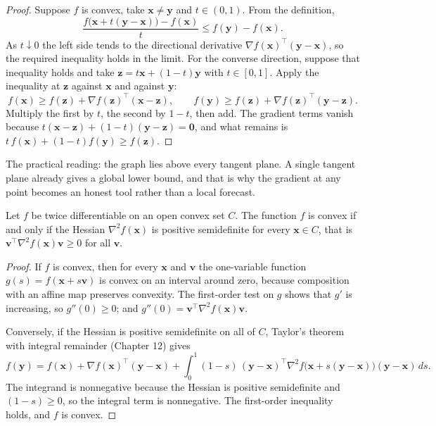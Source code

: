 \begin{proof}
Suppose $f$ is convex, take $\mathbf{x}\ne\mathbf{y}$ and $t\in(0,1)$. From the definition,
\[
  \frac{f\bigl(\mathbf{x}+t(\mathbf{y}-\mathbf{x})\bigr)-f(\mathbf{x})}{t}
  \le f(\mathbf{y})-f(\mathbf{x}).
\]
As $t\downarrow0$ the left side tends to the directional derivative
$\nabla f(\mathbf{x})^{\top}(\mathbf{y}-\mathbf{x})$, so the required inequality holds in the
limit. For the converse direction, suppose that inequality holds and take
$\mathbf{z}=t\mathbf{x}+(1-t)\mathbf{y}$ with $t\in[0,1]$. Apply the inequality at
$\mathbf{z}$ against $\mathbf{x}$ and against $\mathbf{y}$:
\[
  f(\mathbf{x})\ge f(\mathbf{z})+\nabla f(\mathbf{z})^{\top}(\mathbf{x}-\mathbf{z}),
  \qquad
  f(\mathbf{y})\ge f(\mathbf{z})+\nabla f(\mathbf{z})^{\top}(\mathbf{y}-\mathbf{z}).
\]
Multiply the first by $t$, the second by $1-t$, then add. The gradient terms vanish because
$t(\mathbf{x}-\mathbf{z})+(1-t)(\mathbf{y}-\mathbf{z})=\mathbf{0}$, and what remains is
$t\,f(\mathbf{x})+(1-t)f(\mathbf{y})\ge f(\mathbf{z})$.
\end{proof}

The practical reading: the graph lies above every tangent plane. A single tangent plane
already gives a global lower bound, and that is why the gradient at any point becomes an
honest tool rather than a local forecast.

\begin{teorema}
Let $f$ be twice differentiable on an open convex set $C$. The function $f$ is convex if and
only if the Hessian $\nabla^{2}f(\mathbf{x})$ is positive semidefinite for every
$\mathbf{x}\in C$, that is
$\mathbf{v}^{\top}\nabla^{2}f(\mathbf{x})\mathbf{v}\ge0$ for all $\mathbf{v}$.
\end{teorema}

\begin{proof}
If $f$ is convex, then for every $\mathbf{x}$ and $\mathbf{v}$ the one-variable function
$g(s)=f(\mathbf{x}+s\mathbf{v})$ is convex on an interval around zero, because composition
with an affine map preserves convexity. The first-order test on $g$ shows that $g'$ is
increasing, so $g''(0)\ge0$; and $g''(0)=\mathbf{v}^{\top}\nabla^{2}f(\mathbf{x})
\mathbf{v}$.

Conversely, if the Hessian is positive semidefinite on all of $C$, Taylor's theorem with
integral remainder (Chapter 12) gives
\[
  f(\mathbf{y})=f(\mathbf{x})+\nabla f(\mathbf{x})^{\top}(\mathbf{y}-\mathbf{x})
  +\int_{0}^{1}(1-s)\,(\mathbf{y}-\mathbf{x})^{\top}
   \nabla^{2}f\bigl(\mathbf{x}+s(\mathbf{y}-\mathbf{x})\bigr)(\mathbf{y}-\mathbf{x})\,ds .
\]
The integrand is nonnegative because the Hessian is positive semidefinite and $(1-s)\ge0$, so
the integral term is nonnegative. The first-order inequality holds, and $f$ is convex.
\end{proof}

